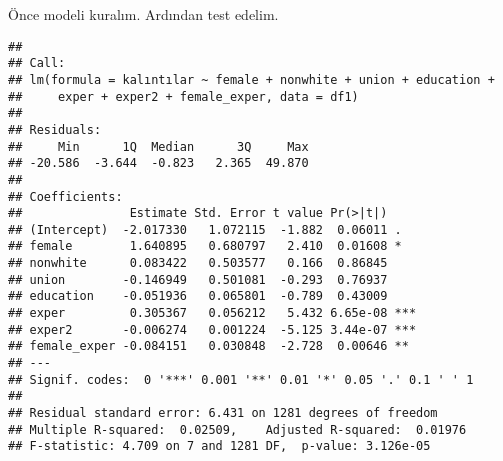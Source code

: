 \documentclass[
]{book}
\newenvironment{Shaded}{\begin{snugshade}}{\end{snugshade}}
\newcommand{\DataTypeTok}[1]{\textcolor[rgb]{0.13,0.29,0.53}{#1}}
\newcommand{\KeywordTok}[1]{\textcolor[rgb]{0.13,0.29,0.53}{\textbf{#1}}}
\newcommand{\NormalTok}[1]{#1}
\newcommand{\OperatorTok}[1]{\textcolor[rgb]{0.81,0.36,0.00}{\textbf{#1}}}
\newcommand{\StringTok}[1]{\textcolor[rgb]{0.31,0.60,0.02}{#1}}
\begin{document}
Önce modeli kuralım. Ardından test edelim.

\begin{Shaded}
\end{Shaded}

\begin{verbatim}
## 
## Call:
## lm(formula = kalıntılar ~ female + nonwhite + union + education + 
##     exper + exper2 + female_exper, data = df1)
## 
## Residuals:
##     Min      1Q  Median      3Q     Max 
## -20.586  -3.644  -0.823   2.365  49.870 
## 
## Coefficients:
##               Estimate Std. Error t value Pr(>|t|)    
## (Intercept)  -2.017330   1.072115  -1.882  0.06011 .  
## female        1.640895   0.680797   2.410  0.01608 *  
## nonwhite      0.083422   0.503577   0.166  0.86845    
## union        -0.146949   0.501081  -0.293  0.76937    
## education    -0.051936   0.065801  -0.789  0.43009    
## exper         0.305367   0.056212   5.432 6.65e-08 ***
## exper2       -0.006274   0.001224  -5.125 3.44e-07 ***
## female_exper -0.084151   0.030848  -2.728  0.00646 ** 
## ---
## Signif. codes:  0 '***' 0.001 '**' 0.01 '*' 0.05 '.' 0.1 ' ' 1
## 
## Residual standard error: 6.431 on 1281 degrees of freedom
## Multiple R-squared:  0.02509,    Adjusted R-squared:  0.01976 
## F-statistic: 4.709 on 7 and 1281 DF,  p-value: 3.126e-05
\end{verbatim}
\end{document}
